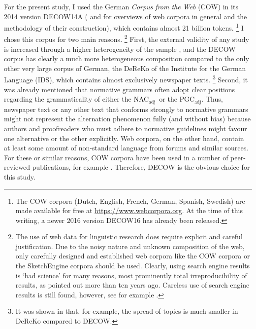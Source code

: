 \documentclass[USenglish]{article}
\newcommand{\Sub}[1]{\ensuremath{\mathrm{_{#1}}}}
\newcommand{\NACa}{NAC\Sub{adj}}
\newcommand{\PGCa}{PGC\Sub{adj}}
\begin{document}
For the present study, I used the German \textit{Corpus from the Web} (COW) in its 2014 version DECOW14A (\citealp{SchaeferBildhauer2012full,Schaefer2015b} and \citealp{BiemannEa2013,SchaeferBildhauer2013} for overviews of web corpora in general and the methodology of their construction), which contains almost 21 billion tokens.%
\footnote{The COW corpora (Dutch, English, French, German, Spanish, Swedish) are made available for free at \url{https://www.webcorpora.org}.
At the time of this writing, a newer 2016 version DECOW16 has already been released.}
I chose this corpus for two main reasons.%
\footnote{The use of web data for linguistic research does require explicit and careful justification.
Due to the noisy nature and unknown composition of the web, only carefully designed and established web corpora like the COW corpora or the SketchEngine corpora \citep{KilgarriffEa2014} should be used.
Clearly, using search engine results is `bad science' for many reasons, most prominently total irreproducibility of results, as \cite{Kilgarriff2006} pointed out more than ten years ago.
Careless use of search engine results is still found, however, see for example \citet[171--175]{DeclerckBrems2016}.}
First, the external validity of any study is increased through a higher heterogeneity of the sample \citep[30]{MaxwellDelaney2004}, and the DECOW corpus has clearly a much more heterogeneous composition compared to the only other very large corpus of German, the DeReKo \citep{KupietzEa2010} of the Institute for the German Language (IDS), which contains almost exclusively newspaper texts.%
\footnote{It was shown in \cite{W16-2601} that, for example, the spread of topics is much smaller in DeReKo compared to DECOW.}
Second, it was already mentioned that normative grammars often adopt clear positions regarding the grammaticality of either the \NACa\ or the \PGCa.
Thus, newspaper text or any other text that conforms strongly to normative grammars might not represent the alternation phenomenon fully (and without bias) because authors and proofreaders who must adhere to normative guidelines might favour one alternative or the other explicitly.
Web corpora, on the other hand, contain at least some amount of non-standard language from forums and similar sources.
For these or similar reasons, COW corpora have been used in a number of peer-reviewed publications, for example \cite{VanGoethemHiligsmann2014,VanGoethemHuening2015,MuellerS2014,Schaefer2016c,SchaeferSayatz2014,SchaeferSayatz2016,Zimmer2015}. 
Therefore, DECOW is the obvious choice for this study.
\end{document}
